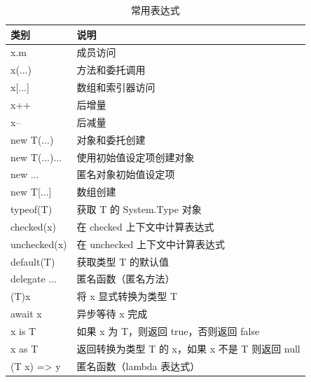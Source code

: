 \begin{table}[htbp]
    \centering
    \caption{常用表达式}
    \label{tab:expression}
    \begin{tabular}{l l}
        \hline
        类别              & 说明                               \\
        \hline
        x.m             & 成员访问                             \\
        x(...)          & 方法和委托调用                          \\
        x[...]          & 数组和索引器访问                         \\
        x++             & 后增量                              \\
        x--             & 后减量                              \\
        new T(...)      & 对象和委托创建                          \\
        new T(...){...} & 使用初始值设定项创建对象                     \\
        new {...}       & 匿名对象初始值设定项                       \\
        new T[...]      & 数组创建                             \\
        typeof(T)       & 获取 T 的 System.Type 对象            \\
        checked(x)      & 在 checked 上下文中计算表达式              \\
        unchecked(x)    & 在 unchecked 上下文中计算表达式            \\
        default(T)      & 获取类型 T 的默认值                      \\
        delegate {...}  & 匿名函数（匿名方法）                       \\
        (T)x            & 将 x 显式转换为类型 T                    \\
        await x         & 异步等待 x 完成                        \\
        x is T          & 如果 x 为 T，则返回 true，否则返回 false     \\
        x as T          & 返回转换为类型 T 的 x，如果 x 不是 T 则返回 null \\
        (T x) => y      & 匿名函数（lambda 表达式）                 \\
        \hline
    \end{tabular}
\end{table}

